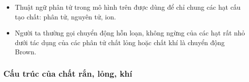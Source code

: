 {\begin{figure}
{%
}
\label{fig:chuyen-dong-brown}
\end{figure}

}
\begin{emcobiet}
	\begin{itemize}
		\item Thuật ngữ phân tử trong mô hình trên được dùng để chỉ chung các hạt cấu tạo chất: phân tử, nguyên tử, ion.
		\item Người ta thường gọi chuyển động hỗn loạn, không ngừng của các hạt rất nhỏ dưới tác dụng của các phân tử chất lỏng hoặc chất khí là chuyển động Brown.
	\end{itemize}
\end{emcobiet}


\subsubsection{Cấu trúc của chất rắn, lỏng, khí}

